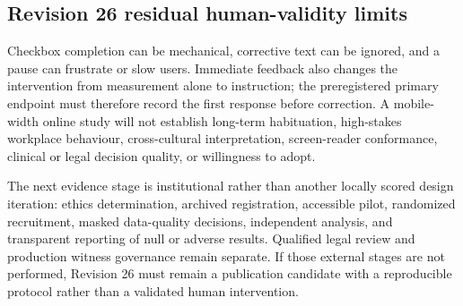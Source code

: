 

\subsection{Revision 26 residual human-validity limits}

Checkbox completion can be mechanical, corrective text can be ignored, and a pause can frustrate or slow users. Immediate feedback also changes the intervention from measurement alone to instruction; the preregistered primary endpoint must therefore record the first response before correction. A mobile-width online study will not establish long-term habituation, high-stakes workplace behaviour, cross-cultural interpretation, screen-reader conformance, clinical or legal decision quality, or willingness to adopt.

The next evidence stage is institutional rather than another locally scored design iteration: ethics determination, archived registration, accessible pilot, randomized recruitment, masked data-quality decisions, independent analysis, and transparent reporting of null or adverse results. Qualified legal review and production witness governance remain separate. If those external stages are not performed, Revision 26 must remain a publication candidate with a reproducible protocol rather than a validated human intervention.
